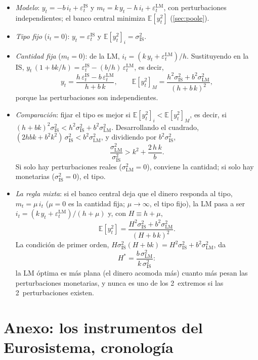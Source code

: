 \documentclass[11pt]{article}
\begin{document}
\begin{itemize}
\item \emph{Modelo}: $y_t=-b\,i_t+\varepsilon^{\mathrm{IS}}_t$ y $m_t=k\,y_t-h\,i_t+\varepsilon^{\mathrm{LM}}_t$, con perturbaciones independientes; el banco central minimiza $\mathbb{E}[y_t^2]$ (\ref{sec:poole}).
\item \emph{Tipo fijo} ($i_t=0$): $y_t=\varepsilon^{\mathrm{IS}}_t$ y $\mathbb{E}[y_t^2]_i=\sigma^2_{\mathrm{IS}}$.
\item \emph{Cantidad fija} ($m_t=0$): de la LM, $i_t=(k\,y_t+\varepsilon^{\mathrm{LM}}_t)/h$. Sustituyendo en la IS, $y_t\,(1+bk/h)=\varepsilon^{\mathrm{IS}}_t-(b/h)\,\varepsilon^{\mathrm{LM}}_t$, es decir,
  $$y_t=\frac{h\,\varepsilon^{\mathrm{IS}}_t-b\,\varepsilon^{\mathrm{LM}}_t}{h+b\,k},\qquad \mathbb{E}[y_t^2]_M=\frac{h^2\sigma^2_{\mathrm{IS}}+b^2\sigma^2_{\mathrm{LM}}}{(h+b\,k)^2},$$
  porque las perturbaciones son independientes.
\item \emph{Comparación}: fijar el tipo es mejor si $\mathbb{E}[y_t^2]_i<\mathbb{E}[y_t^2]_M$, es decir, si $(h+bk)^2\sigma^2_{\mathrm{IS}}<h^2\sigma^2_{\mathrm{IS}}+b^2\sigma^2_{\mathrm{LM}}$. Desarrollando el cuadrado, $(2hbk+b^2k^2)\,\sigma^2_{\mathrm{IS}}<b^2\sigma^2_{\mathrm{LM}}$, y dividiendo por $b^2\sigma^2_{\mathrm{IS}}$,
  $$\frac{\sigma^2_{\mathrm{LM}}}{\sigma^2_{\mathrm{IS}}}>k^2+\frac{2\,h\,k}{b} .$$
  Si solo hay perturbaciones reales ($\sigma^2_{\mathrm{LM}}=0$), conviene la cantidad; si solo hay monetarias ($\sigma^2_{\mathrm{IS}}=0$), el tipo.\findemo
\item \emph{La regla mixta}: si el banco central deja que el dinero responda al tipo, $m_t=\mu\,i_t$ ($\mu=0$ es la cantidad fija; $\mu\to\infty$, el tipo fijo), la LM pasa a ser $i_t=(k\,y_t+\varepsilon^{\mathrm{LM}}_t)/(h+\mu)$ y, con $H\equiv h+\mu$,
  $$\mathbb{E}[y_t^2]=\frac{H^2\sigma^2_{\mathrm{IS}}+b^2\sigma^2_{\mathrm{LM}}}{(H+b\,k)^2} .$$
  La condición de primer orden, $H\sigma^2_{\mathrm{IS}}(H+bk)=H^2\sigma^2_{\mathrm{IS}}+b^2\sigma^2_{\mathrm{LM}}$, da
  $$H^*=\frac{b\,\sigma^2_{\mathrm{LM}}}{k\,\sigma^2_{\mathrm{IS}}} :$$
  la LM óptima es más plana (el dinero acomoda más) cuanto más pesan las perturbaciones monetarias, y nunca es uno de los 2~extremos si las 2~perturbaciones existen\nocite{Poole1970Optimal}.\findemo
\end{itemize}

\section{Anexo: los instrumentos del Eurosistema, cronología}\label{anexo:cronologia}
\end{document}
